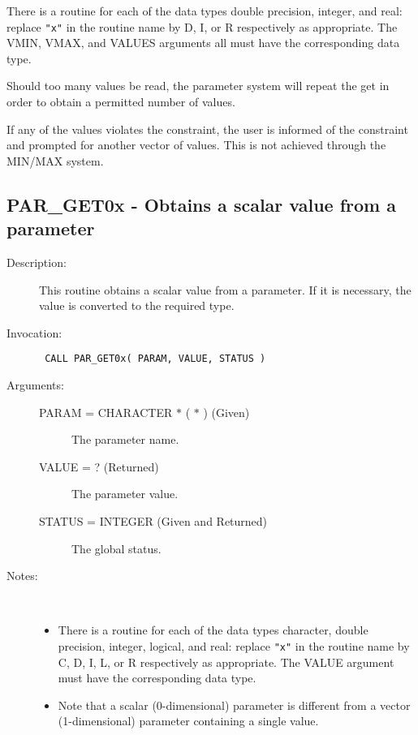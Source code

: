 \documentclass[twoside,11pt]{article}
\newcommand{\xlabel}[1]{}
\newlength{\sstbannerlength}
\newlength{\sstcaptionlength}
\newlength{\sstexampleslength}
\newlength{\sstexampleswidth}
\newcommand{\sstroutine}[3]{
   \goodbreak
   \rule{\textwidth}{0.5mm}
   \vspace{-7ex}
   \newline
   \settowidth{\sstbannerlength}{{\Large {\bf #1}}}
   \setlength{\sstcaptionlength}{\textwidth}
   \setlength{\sstexampleslength}{\textwidth}
   \addtolength{\sstbannerlength}{0.5em}
   \addtolength{\sstcaptionlength}{-2.0\sstbannerlength}
   \addtolength{\sstcaptionlength}{-5.0pt}
   \settowidth{\sstexampleswidth}{{\bf Examples:}}
   \addtolength{\sstexampleslength}{-\sstexampleswidth}
   \parbox[t]{\sstbannerlength}{\flushleft{\Large {\bf #1}}}
   \parbox[t]{\sstcaptionlength}{\center{\Large #2}}
   \parbox[t]{\sstbannerlength}{\flushright{\Large {\bf #1}}}
   \begin{description}
      #3
   \end{description}
}
\newcommand{\sstdescription}[1]{\item[Description:] #1}
\newcommand{\sstinvocation}[1]{\item[Invocation:]\hspace{0.4em}{\tt #1}}
\newcommand{\sstarguments}[1]{
   \item[Arguments:] \mbox{} \\
   \vspace{-3.5ex}
   \begin{description}
      #1
   \end{description}
}
\newcommand{\sstsubsection}[1]{ \item[{#1}] \mbox{} \\}
\newcommand{\sstnotes}[1]{\item[Notes:] \mbox{} \\[1.3ex] #1}
\newcommand{\sstitemlist}[1]{
  \mbox{} \\
  \vspace{-7ex}
  \begin{itemize}
     #1
  \end{itemize}
}
\newcommand{\sstitem}{\item}
\newcommand{\ssttt}{\tt}
\renewcommand{\sstroutine}[3]{
      \subsection{\xlabel{12}#1\xlabel{#1}-\label{#1}#2}
      \begin{description}
         #3
      \end{description}
   }
\renewcommand{\sstdescription}[1]{\item[Description:]
      \begin{description}
         #1
      \end{description}
   }
\renewcommand{\sstinvocation}[1]{\item[Invocation:]
      \begin{description}
         {\ssttt #1}
      \end{description}
   }
\renewcommand{\sstarguments}[1]{
      \item[Arguments:]
      \begin{description}
         #1
      \end{description}
   }
\renewcommand{\sstsubsection}[1]{\item[{#1}]}
\renewcommand{\sstnotes}[1]{\item[Notes:]
      \begin{description}
         #1
      \end{description}
   }
\newcommand{\sstitemlist}[1]{
      \begin{itemize}
         #1
      \end{itemize}
   }
\begin{document}
{{{         \sstitem
         There is a routine for each of the data types double precision,
         integer, and real: replace {\tt "x"} in the routine name by D, I, or R
         respectively as appropriate.  The VMIN, VMAX, and VALUES arguments
         all must have the corresponding data type.

         \sstitem
         Should too many values be read, the parameter system will
         repeat the get in order to obtain a permitted number of values.

         \sstitem
         If any of the values violates the constraint, the user is
         informed of the constraint and prompted for another vector of
         values.  This is not achieved through the MIN/MAX system.
      }
   }
}

\sstroutine{
   PAR\_GET0x
}{
   Obtains a scalar value from a parameter
}{
   \sstdescription{
      This routine obtains a scalar value from a parameter.  If it is
      necessary, the value is converted to the required type.
   }
   \sstinvocation{
      CALL PAR\_GET0x( PARAM, VALUE, STATUS )
   }
   \sstarguments{
      \sstsubsection{
         PARAM = CHARACTER $*$ ( $*$ ) (Given)
      }{
         The parameter name.
      }
      \sstsubsection{
         VALUE = ? (Returned)
      }{
         The parameter value.
      }
      \sstsubsection{
         STATUS = INTEGER (Given and Returned)
      }{
         The global status.
      }
   }
   \sstnotes{
      \sstitemlist{

         \sstitem
         There is a routine for each of the data types character,
         double precision, integer, logical, and real: replace {\tt "x"} in the
         routine name by C, D, I, L, or R respectively as appropriate.  The
         VALUE argument must have the corresponding data type.

         \sstitem
         Note that a scalar (0-dimensional) parameter is different from
         a vector (1-dimensional) parameter containing a single value.
      }
   }
}
\end{document}
